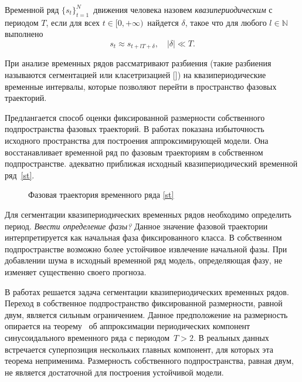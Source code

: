 \documentclass[12pt, twoside]{article}
\theoremstyle{definition}
\def\NN{\mathbb N}
\begin{document}
Временной ряд $\{s_t\}_{t=1}^N$\, движения человека назовем \emph{квазипериодическим} с периодом $T$, если для всех $t\in[0,+\infty)\,$ найдется $\delta$, такое что для любого $l\in\NN\,$ выполнено
    \begin{equation}\label{st}
       s_{t} \approx s_{t + lT + \delta}, \quad |\delta| \ll T.
    \end{equation}

При анализе временных рядов рассматривают разбиения (такие разбиения называются сегментацией или класетризацией []) на квазипериодические временные интервалы, которые позволяют перейти в пространство фазовых траекторий. 

Предлангается способ оценки фиксированной размерности собственного подпространства фазовых траекторий. В работах \cite{motrenko2015extracting, grabovoy2020quasi, usmanova} показана избыточность исходного пространства для построения аппроксимирующей модели. Она восстанавливает временной ряд по фазовым траекториям в собственном подпространстве. адекватно приближая исходный квазипериодический временной ряд~\eqref{st}. 

  \begin{figure}[ht]\label{fig1}
            \caption{Фазовая траектория временного ряда \eqref{st}}
    \end{figure}

Для сегментации квазипериодических временных рядов необходимо определить период. 
\emph{Ввести определение фазы?}
Данное значение фазовой траектории интерпретируется как начальная фаза фиксированного класса. В собственном подпространстве возможно более устойчивое извлечение начальной фазы. При добавлении шума в исходный временной ряд модель, определяющая фазу, не изменяет существенно своего прогноза.   

В работах \cite{motrenko2015extracting, ignatov2016human}  решается задача сегментации квазипериодических временных рядов. Переход в собственное подпространство фиксированной размерности, равной двум, является сильным ограничением. Данное предположение на размерность опирается на теорему~\cite{motrenko2015extracting} об аппроксимации периодических компонент синусоидального временного ряда с периодом~$T > 2$. В реальных данных встречается суперпозиция нескольких главных компонент, для которых эта теорема неприменима. Размерность собственного подпространства, равная двум, не является достаточной для построения устойчивой модели.
\end{document}

